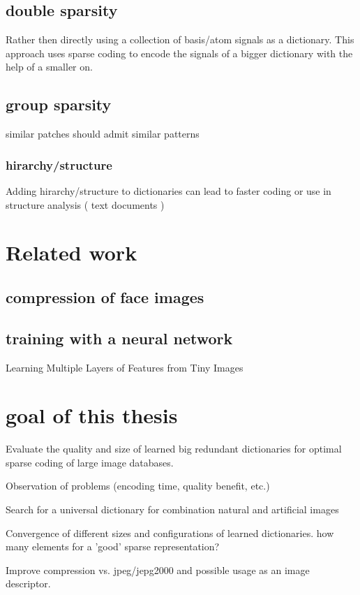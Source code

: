 \subsection{double sparsity}
Rather then directly using a collection of basis/atom signals as a dictionary. This approach uses sparse coding
to encode the signals of a bigger dictionary with the help of a smaller on. \cite{double sparsity}

\subsection{group sparsity}
similar patches should admit similar patterns
  
\cite{double sparsity}
\subsubsection{hirarchy/structure}
Adding hirarchy/structure to dictionaries can lead to faster coding or use in structure analysis ( text documents )
\cite{Jenatton2010}



\section{Related work}

\subsection{compression of face images}

\subsection{training with a neural network}
Learning Multiple Layers of Features from Tiny Images \cite{Krizhevsky2009}

\section{goal of this thesis}
Evaluate the quality and size of learned big redundant dictionaries for 
optimal sparse coding of large image databases.

Observation of problems (encoding time, quality benefit, etc.)

Search for a universal dictionary for combination natural and artificial images
 
Convergence of different sizes and configurations of learned dictionaries.
how many elements for a 'good' sparse representation?



Improve compression vs. jpeg/jepg2000 and possible usage as an image descriptor.
